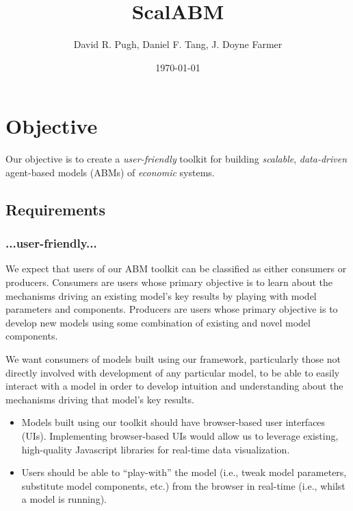 \documentclass[11pt]{amsart}
\title{ScalABM}
\author{David R. Pugh, Daniel F. Tang, J. Doyne Farmer}
\date{\today}
\begin{document}
\maketitle

\section{Objective}
Our objective is to create a \textit{user-friendly} toolkit for building \textit{scalable}, \textit{data-driven} agent-based models (ABMs) of \textit{economic} systems.

\subsection{Requirements}

\subsubsection{...user-friendly...}
We expect that users of our ABM toolkit can be classified as either consumers or producers. Consumers are users whose primary objective is to learn about the mechanisms driving an existing model's key results by playing with model parameters and components. Producers are users whose primary objective is to develop new models using some combination of existing and novel model components.

We want consumers of models built using our framework, particularly those not directly involved with development of any particular model, to be able to easily interact with a model in order to develop intuition and understanding about the mechanisms driving that model's key results.
\begin{itemize}
    \item Models built using our toolkit should have browser-based user interfaces (UIs). Implementing browser-based UIs would allow us to leverage existing, high-quality Javascript libraries for real-time data visualization.
    \item Users should be able to ``play-with'' the model (i.e., tweak model parameters, substitute model components, etc.) from the browser in real-time (i.e., whilst a model is running).
\end{itemize}
\end{document}
